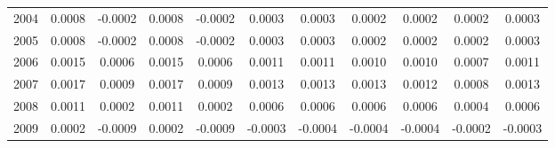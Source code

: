 \begin{tabular}{ccccccccccc}
  2004 & 0.0008 & -0.0002 & 0.0008 & -0.0002 & 0.0003 & 0.0003 & 0.0002 & 0.0002 & 0.0002 & 0.0003 \\ 
  2005 & 0.0008 & -0.0002 & 0.0008 & -0.0002 & 0.0003 & 0.0003 & 0.0002 & 0.0002 & 0.0002 & 0.0003 \\ 
  2006 & 0.0015 & 0.0006 & 0.0015 & 0.0006 & 0.0011 & 0.0011 & 0.0010 & 0.0010 & 0.0007 & 0.0011 \\ 
  2007 & 0.0017 & 0.0009 & 0.0017 & 0.0009 & 0.0013 & 0.0013 & 0.0013 & 0.0012 & 0.0008 & 0.0013 \\ 
  2008 & 0.0011 & 0.0002 & 0.0011 & 0.0002 & 0.0006 & 0.0006 & 0.0006 & 0.0006 & 0.0004 & 0.0006 \\ 
  2009 & 0.0002 & -0.0009 & 0.0002 & -0.0009 & -0.0003 & -0.0004 & -0.0004 & -0.0004 & -0.0002 & -0.0003 \\ 
   \hline
\end{tabular}
